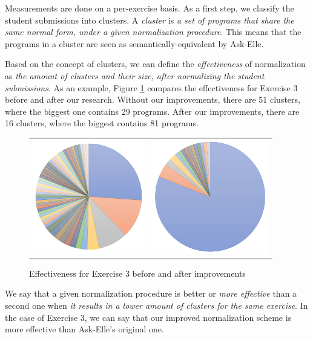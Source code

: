 Measurements are done on a per-exercise basis. As a first step, we classify the student submissions into clusters. A \emph{cluster} is \emph{a set of programs that share the same normal form, under a given normalization procedure}. This means that the programs in a cluster are seen as semantically-equivalent by Ask-Elle.

Based on the concept of clusters, we can define the \emph{effectiveness} of normalization as \emph{the amount of clusters and their size, after normalizing the student submissions}. As an example, Figure \ref{fig:method-ex3-clusters} compares the effectiveness for Exercise 3 before and after our research. Without our improvements, there are 51 clusters, where the biggest one contains 29 programs. After our improvements, there are 16 clusters, where the biggest contains 81 programs.

\begin{figure}
\centering
\begin{tabular}{ >{\centering\arraybackslash}m{13em} | >{\centering\arraybackslash}m{13em} }
\includegraphics[height=5cm]{graphs/ex3-clusters-original.png}
&
\includegraphics[height=5cm]{graphs/ex3-clusters.png}
\end{tabular}
\caption{Effectiveness for Exercise 3 before and after improvements}
\label{fig:method-ex3-clusters}
\end{figure}

We say that a given normalization procedure is better or \emph{more effective} than a second one when \emph{it results in a lower amount of clusters for the same exercise}. In the case of Exercise 3, we can say that our improved normalization scheme is more effective than Ask-Elle's original one.

